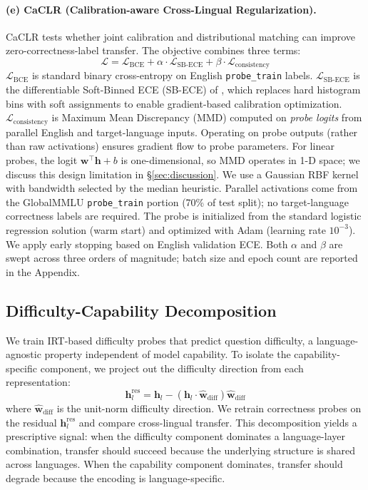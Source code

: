 \paragraph{(e) CaCLR (Calibration-aware Cross-Lingual Regularization).} CaCLR tests whether joint calibration and distributional matching can improve zero-correctness-label transfer. The objective combines three terms:
\begin{equation}
  \mathcal{L} = \mathcal{L}_{\text{BCE}} + \alpha \cdot \mathcal{L}_{\text{SB-ECE}} + \beta \cdot \mathcal{L}_{\text{consistency}}
  \label{eq:caclr}
\end{equation}
$\mathcal{L}_{\text{BCE}}$ is standard binary cross-entropy on English \texttt{probe\_train} labels. $\mathcal{L}_{\text{SB-ECE}}$ is the differentiable Soft-Binned ECE (SB-ECE) of \citet{karandikar2021sbece}, which replaces hard histogram bins with soft assignments to enable gradient-based calibration optimization. $\mathcal{L}_{\text{consistency}}$ is Maximum Mean Discrepancy (MMD) computed on \emph{probe logits} from parallel English and target-language inputs. Operating on probe outputs (rather than raw activations) ensures gradient flow to probe parameters. For linear probes, the logit $\mathbf{w}^\top \mathbf{h} + b$ is one-dimensional, so MMD operates in 1-D space; we discuss this design limitation in \S\ref{sec:discussion}. We use a Gaussian RBF kernel with bandwidth selected by the median heuristic. Parallel activations come from the GlobalMMLU \texttt{probe\_train} portion (70\% of test split); no target-language correctness labels are required. The probe is initialized from the standard logistic regression solution (warm start) and optimized with Adam (learning rate $10^{-3}$). We apply early stopping based on English validation ECE. Both $\alpha$ and $\beta$ are swept across three orders of magnitude; batch size and epoch count are reported in the Appendix.

\subsection{Difficulty-Capability Decomposition}
\label{sec:decomposition}

We train IRT-based difficulty probes that predict question difficulty, a language-agnostic property independent of model capability. To isolate the capability-specific component, we project out the difficulty direction from each representation:
\begin{equation}
  \mathbf{h}_l^{\text{res}} = \mathbf{h}_l - (\mathbf{h}_l \cdot \hat{\mathbf{w}}_{\text{diff}})\hat{\mathbf{w}}_{\text{diff}}
  \label{eq:residual}
\end{equation}
where $\hat{\mathbf{w}}_{\text{diff}}$ is the unit-norm difficulty direction. We retrain correctness probes on the residual $\mathbf{h}_l^{\text{res}}$ and compare cross-lingual transfer. This decomposition yields a prescriptive signal: when the difficulty component dominates a language-layer combination, transfer should succeed because the underlying structure is shared across languages. When the capability component dominates, transfer should degrade because the encoding is language-specific.

